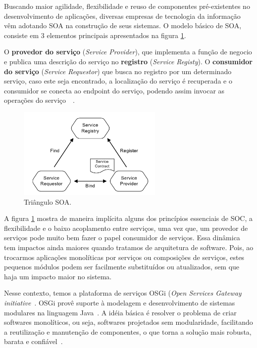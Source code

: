 Buscando maior agilidade, flexibilidade e reuso de componentes pré-existentes no desenvolvimento de aplicações, diversas empresas de tecnologia da informação vêm adotando SOA na construção de seus sistemas. O modelo básico de SOA, consiste em 3 elementos principais apresentados na figura \ref{fig:soatriangle}.

O \textbf{provedor do serviço} (\textit{Service Provider}), que implementa a função de negocio e publica uma descrição do serviço no \textbf{registro} (\textit{Service Registy}). O \textbf{consumidor do serviço} (\textit{Service Requestor}) que busca no registro por um determinado serviço, caso este seja encontrado, a localização do serviço é recuperada e o consumidor se conecta ao endpoint do serviço, podendo assim invocar as operações do serviço~\cite{michlmayr2007towards}~\cite{huhns2005service}.

\begin{figure}[htp]
\centering
\includegraphics[width=7cm]{chapters/intro/soa_triangle.png}
\caption[Triângulo SOA]{Triângulo SOA.}
\label{fig:soatriangle}
\end{figure}

A figura \ref{fig:soatriangle} mostra de maneira implícita alguns dos princípios essenciais de SOC, a flexibilidade e o baixo acoplamento entre serviços, uma vez que, um provedor de serviços pode muito bem fazer o papel consumidor de serviços. Essa dinâmica tem impactos ainda maiores quando tratamos de arquitetura de software. Pois, ao trocarmos aplicações monolíticas por serviços ou composições de serviços, estes pequenos módulos podem ser facilmente substituídos ou atualizados, sem que haja um impacto maior no sistema.

Nesse contexto, temos a plataforma de serviços OSGi (\textit{Open Services Gateway initiative}~\cite{alliance2007osgi}. OSGi provê suporte à modelagem e desenvolvimento de sistemas modulares na linguagem Java~\cite{hall2010osgi}. A idéia básica é resolver o problema de criar softwares monolíticos, ou seja, softwares projetados sem modularidade, facilitando a reutilização e manutenção de  componentes, o que torna a solução mais robusta, barata e confiável~\cite{davis2009open}.

